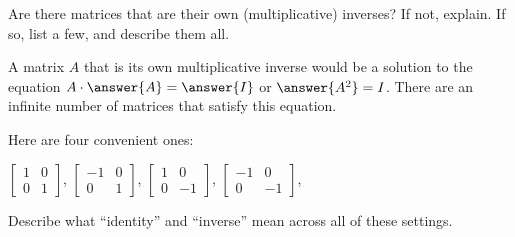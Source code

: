 \documentclass[space,nooutcomes]{ximera}
\begin{document}
\begin{question}
Are there matrices that are their own (multiplicative) inverses?  If not, explain.  If so, list a few, and describe them all.
\begin{solution}
A matrix $A$ that is its own multiplicative inverse would be a solution to the equation $A\cdot \answer{A}=\answer{I}$ or $\answer{A^2}=I$.  There are an infinite number of matrices that satisfy this equation.  
\begin{feedback}[correct]
Here are four convenient ones: 

$\begin{bmatrix} 1&0 \\ 0&1 \end{bmatrix}$, $\begin{bmatrix} -1&0 \\ 0&1 \end{bmatrix}$, $\begin{bmatrix} 1&0 \\ 0&-1 \end{bmatrix}$, $\begin{bmatrix} -1&0 \\ 0&-1 \end{bmatrix}$,
\end{feedback}
\end{solution}
\end{question}

\begin{question}
Describe what ``identity'' and ``inverse'' mean across all of these settings.  
\begin{freeResponse}
\end{freeResponse}
\end{question}
\end{document}
